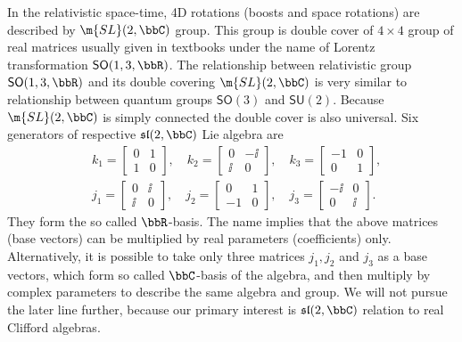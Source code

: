 %
\begin{example}\label{SL2C} In the
relativistic space-time, 4D rotations (boosts  and space
rotations)  are described by $\m{SL}(2,\bbC)$ group. This group is
 double cover of $4\times 4$ group of real matrices usually given
in textbooks under the name of Lorentz transformation $\mathsf{SO}(1,3,\bbR)$. The relationship between relativistic
group $\mathsf{SO}(1,3,\bbR)$ and its double covering $\m{SL}(2,\bbC)$ is
very similar to relationship between quantum groups
$\mathsf{SO}(3)$ and $\mathsf{SU}(2)$. Because $\m{SL}(2,\bbC)$ is
simply connected the double cover is also universal. Six
generators of respective $\mathfrak{sl}(2,\bbC)$ Lie algebra are
\[
\begin{split}
&k_1=\begin{bmatrix}0&1\\1&0\end{bmatrix},\quad
k_2=\begin{bmatrix}0&-\ii\\\ii&0\end{bmatrix},\quad
k_3=\begin{bmatrix}-1&0\\0&1\end{bmatrix},\\
&j_1=\begin{bmatrix}0&\ii\\\ii&0\end{bmatrix},\quad
j_2=\begin{bmatrix}0&1\\-1&0\end{bmatrix},\quad
j_3=\begin{bmatrix}-\ii&0\\0&\ii\end{bmatrix}.
\end{split}
\]
They form the so called $\bbR$-basis. The name implies that
the above matrices (base vectors) can be multiplied by real
parameters (coefficients) only. Alternatively, it is possible to
take only three matrices $j_1, j_2$ and $j_3$ as a base vectors,
which form so called $\bbC$-basis of the algebra, and then
multiply by complex parameters to describe the same algebra and
group. We will not pursue the later line further, because our primary
interest is $\mathfrak{sl}(2,\bbC)$ relation to real Clifford
algebras.


\end{example}
